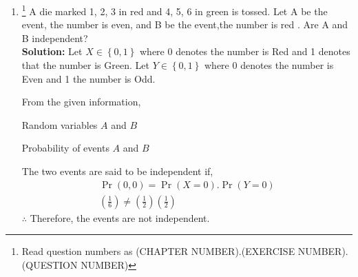 \documentclass{article}
\providecommand{\cbrak}[1]{\ensuremath{\left\{#1\right\}}}
\newcommand{\solution}{\noindent \textbf{Solution: }}
\providecommand{\pr}[1]{\ensuremath{\Pr\left(#1\right)}}
\numberwithin{table}{enumi}
\begin{document}
\begin{enumerate}[label=13.\arabic{enumi}.\arabic{enumii}]
\setcounter{enumi}{1}
\setcounter{enumii}{5}
\item \footnote{Read question numbers as (CHAPTER NUMBER).(EXERCISE NUMBER).(QUESTION NUMBER)}
A die marked 1, 2, 3 in red and 4, 5, 6 in green is tossed. Let A be the event,
the number is even, and B be the event,the number is red . Are A and B
independent?\\
\solution
Let $X \in \cbrak{0,1}$ where 0 denotes the number is Red and 1 denotes that the number is Green. Let $Y \in \cbrak{0,1}$ where 0 denotes the number is Even and 1 the number is Odd.

From the given information,
\begin{table}[h]
\centering

	 \caption{Random variables $A$ and $B$}
	 \label{table:1}   
\end{table}

\begin{table}[h]
\centering

	 \caption{Probability of events $A$ and $B$}
	 \label{table:2}   
\end{table}
The two events are said to be independent if,
\begin{align}
\pr{0,0} = \pr{X=0}.\pr{Y=0}\\
\left(\frac{1}{6}\right) \neq \left(\frac{1}{2}\right)\left(\frac{1}{2}\right)
\end{align}
$\therefore$ Therefore, the events are not independent.
\end{enumerate}
\end{document}
